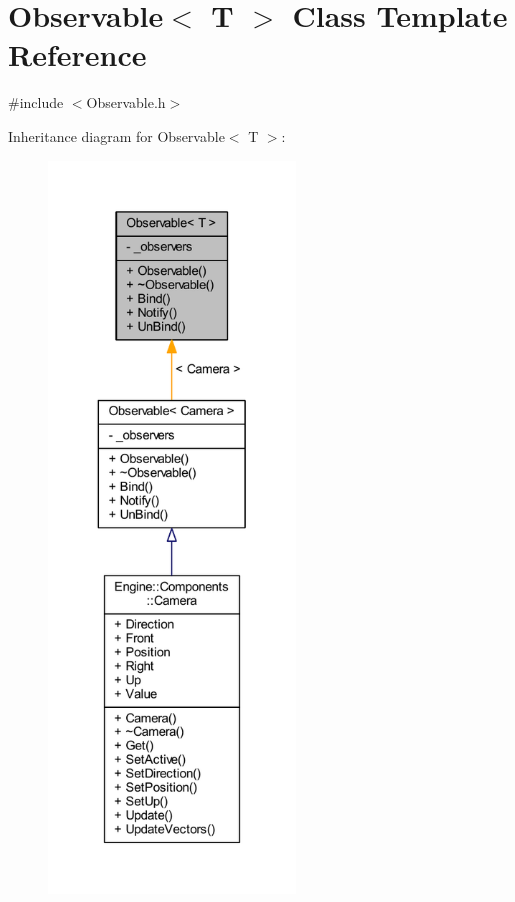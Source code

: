 \hypertarget{classObservable}{}\section{Observable$<$ T $>$ Class Template Reference}
\label{classObservable}


{\ttfamily \#include $<$Observable.\+h$>$}



Inheritance diagram for Observable$<$ T $>$\+:
\nopagebreak
\begin{figure}[H]
\begin{center}
\leavevmode
\includegraphics[height=550pt]{classObservable__inherit__graph}
\end{center}
\end{figure}


